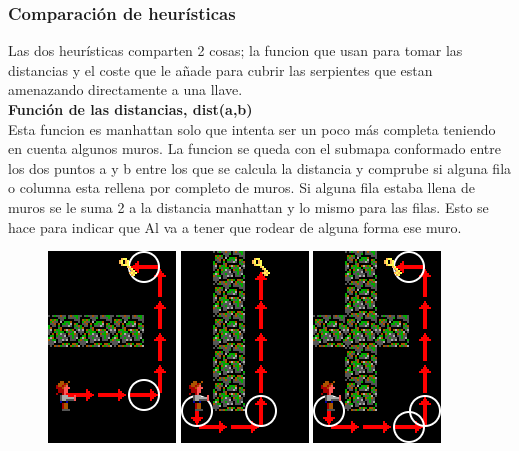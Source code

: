 \documentclass[11pt,spanish]{article}
\begin{document}
		\subsubsection{Comparación de heurísticas}
			Las dos heurísticas comparten 2 cosas; la funcion que usan para tomar las distancias y el coste que le añade para cubrir las serpientes que estan amenazando directamente a una llave.\\
			\textbf{Función de las distancias, dist(a,b)}\\
			Esta funcion es manhattan solo que intenta ser un poco más completa teniendo en cuenta algunos muros. La funcion se queda con el submapa conformado entre los dos puntos a y b entre los que se calcula la distancia y comprube si alguna fila o columna esta rellena por completo de muros. Si alguna fila estaba llena de muros se le suma 2 a la distancia manhattan y lo mismo para las filas. Esto se hace para indicar que Al va a tener que rodear de alguna forma ese muro.
			\begin{figure}[h!]
				\includegraphics[width=0.32\linewidth]{Horizontal.png}
				\includegraphics[width=0.32\linewidth]{Vertical.png}
				\includegraphics[width=0.32\linewidth]{HorizontalVertical.png}
			\end{figure}
\end{document}
